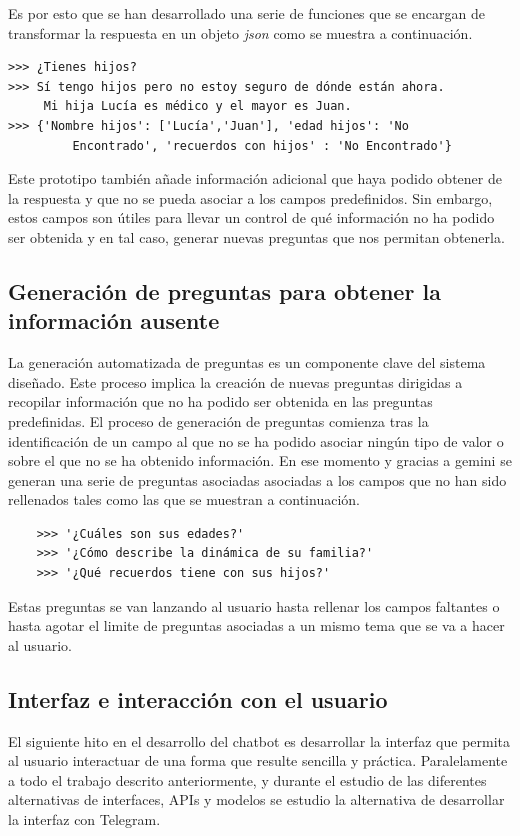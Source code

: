 Es por esto que se han desarrollado una serie de funciones que se encargan de transformar la respuesta en un objeto \textit{json} como se muestra a continuación. 

	\begin{verbatim}
>>>	¿Tienes hijos?
>>> Sí tengo hijos pero no estoy seguro de dónde están ahora.
     Mi hija Lucía es médico y el mayor es Juan.
>>> {'Nombre hijos': ['Lucía','Juan'], 'edad hijos': 'No
    	 Encontrado', 'recuerdos con hijos' : 'No Encontrado'}
	\end{verbatim}
	
Este prototipo también añade información adicional que haya podido obtener de la respuesta y que no se pueda asociar a los campos predefinidos. Sin embargo, estos campos son útiles para llevar un control de qué información no ha podido ser obtenida y en tal caso, generar nuevas preguntas que nos permitan obtenerla. 

 
\subsection{Generación de preguntas para obtener la información ausente}
La generación automatizada de preguntas es un componente clave del sistema diseñado. Este proceso implica la creación de nuevas preguntas dirigidas a recopilar información que no ha podido ser obtenida en las preguntas predefinidas. El proceso de generación de preguntas comienza tras la identificación de un campo al que no se ha podido asociar ningún tipo de valor o sobre el que no se ha obtenido información. En ese momento y gracias a gemini se generan una serie de preguntas asociadas asociadas a los campos que no han sido rellenados tales como las que se muestran a continuación.  

\begin{verbatim}
	>>>	'¿Cuáles son sus edades?'
	>>> '¿Cómo describe la dinámica de su familia?'
	>>> '¿Qué recuerdos tiene con sus hijos?'
\end{verbatim}
	
Estas preguntas se van lanzando al usuario hasta rellenar los campos faltantes o hasta agotar el limite de preguntas asociadas a un mismo tema que se va a hacer al usuario.

\subsection{Interfaz e interacción con el usuario}
El siguiente hito en el desarrollo del chatbot es desarrollar la interfaz que permita al usuario interactuar de una forma que resulte sencilla y práctica. Paralelamente a todo el trabajo descrito anteriormente, y durante el estudio de las diferentes alternativas de interfaces, APIs y modelos se estudio la alternativa de desarrollar la interfaz con Telegram. 

